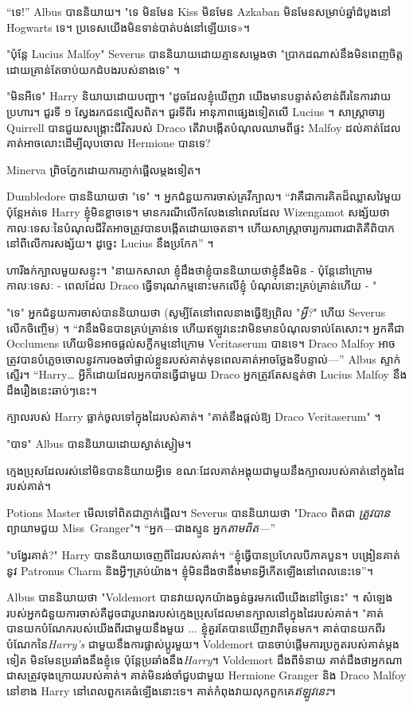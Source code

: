 {{{“ទេ!” Albus បាននិយាយ។ "ទេ មិនមែន Kiss មិនមែន Azkaban មិនមែនសម្រាប់ឆ្នាំដំបូងនៅ Hogwarts ទេ។ ប្រទេស​យើង​មិន​ទាន់​បាត់បង់​នៅឡើយ​ទេ​»​។

"ប៉ុន្តែ Lucius Malfoy" Severus បាននិយាយដោយគ្មានសម្លេងថា "ប្រាកដណាស់នឹងមិនពេញចិត្តដោយគ្រាន់តែចាប់យកដំបងរបស់នាងទេ" ។

"មិនអីទេ" Harry និយាយដោយបញ្ជា។ "ដូចដែលខ្ញុំឃើញវា យើងមានបន្ទាត់សំខាន់ពីរនៃការវាយប្រហារ។ ជួរទី ១ ស្វែងរកជនល្មើសពិត។ ជួរទីពីរ អានុភាពផ្សេងទៀតលើ Lucius ។ សាស្រ្តាចារ្យ Quirrell បានជួយសង្គ្រោះជីវិតរបស់ Draco តើវាបង្កើតបំណុលឈាមពីផ្ទះ Malfoy ដល់គាត់ដែលគាត់អាចលោះដើម្បីលុបចោល Hermione បានទេ?

Minerva ព្រិចភ្នែកដោយការភ្ញាក់ផ្អើលម្តងទៀត។

Dumbledore បាននិយាយថា "ទេ" ។ អ្នកជំនួយការចាស់គ្រវីក្បាល។ “វាគឺជាការគិតដ៏ឈ្លាសវៃមួយ ប៉ុន្តែអត់ទេ Harry ខ្ញុំមិនខ្លាចទេ។ មានករណីលើកលែងនៅពេលដែល Wizengamot សង្ស័យថាកាលៈទេសៈនៃបំណុលជីវិតអាចត្រូវបានបង្កើតដោយចេតនា។ ហើយ​សាស្ត្រាចារ្យ​ការពារ​ជាតិ​គឺ​ពិបាក​នៅ​ពី​លើ​ការ​សង្ស័យ។ ដូច្នេះ Lucius នឹងប្រកែក” ។

ហារីងក់ក្បាលមួយសន្ទុះ។ "នាយកសាលា ខ្ញុំដឹងថាខ្ញុំបាននិយាយថាខ្ញុំនឹងមិន - ប៉ុន្តែនៅក្រោមកាលៈទេសៈ - ពេលដែល Draco ធ្វើទារុណកម្មនោះមកលើខ្ញុំ បំណុលនោះគ្រប់គ្រាន់ហើយ - "

"ទេ" អ្នកជំនួយការចាស់បាននិយាយថា (សូម្បីតែនៅពេលនាងធ្វើឱ្យព្រិល "\emph{អ្វី?}" ហើយ Severus លើកចិញ្ចើម) ។ “វា​នឹង​មិន​បាន​គ្រប់​គ្រាន់​ទេ ហើយ​ឥឡូវ​នេះ​វា​មិន​មាន​បំណុល​ទាល់​តែ​សោះ។ អ្នកគឺជា Occlumens ហើយមិនអាចផ្តល់សក្ខីកម្មនៅក្រោម Veritaserum បានទេ។ Draco Malfoy អាច​ត្រូវ​បាន​បំភ្លេច​ចោល​នូវ​ការ​ចងចាំ​ផ្ទាល់​ខ្លួន​របស់​គាត់​មុន​ពេល​គាត់​អាច​ថ្លែង​ទីបន្ទាល់—” Albus ស្ទាក់​ស្ទើរ។ “Harry… អ្វីក៏ដោយដែលអ្នកបានធ្វើជាមួយ Draco អ្នកត្រូវតែសន្មត់ថា Lucius Malfoy នឹងដឹងរឿងនេះឆាប់ៗនេះ។

ក្បាលរបស់ Harry ធ្លាក់ចូលទៅក្នុងដៃរបស់គាត់។ "គាត់នឹងផ្តល់ឱ្យ Draco Veritaserum" ។

"បាទ" Albus បាននិយាយដោយស្ងាត់ស្ងៀម។

ក្មេងប្រុសដែលរស់នៅមិនបាននិយាយអ្វីទេ ខណៈដែលគាត់អង្គុយជាមួយនឹងក្បាលរបស់គាត់នៅក្នុងដៃរបស់គាត់។

Potions Master មើលទៅពិតជាភ្ញាក់ផ្អើល។ Severus បាននិយាយថា "Draco ពិតជា \emph{ត្រូវបាន} ព្យាយាមជួយ Miss~Granger"។ “អ្នក—ជាងស្មូន អ្នក\emph{តាមពិត—}”

"បង្វែរគាត់?" Harry បាននិយាយចេញពីដៃរបស់គាត់។ “ខ្ញុំធ្វើបានប្រហែលបីភាគបួន។ បង្រៀនគាត់នូវ Patronus Charm និងអ្វីៗគ្រប់យ៉ាង។ ខ្ញុំមិនដឹងថានឹងមានអ្វីកើតឡើងនៅពេលនេះទេ”។

Albus បាននិយាយថា "Voldemort បានវាយលុកយ៉ាងធ្ងន់ធ្ងរមកលើយើងនៅថ្ងៃនេះ" ។ សំឡេង​របស់​អ្នក​ជំនួយការ​ចាស់​គឺ​ដូច​ជា​រូបរាង​របស់​ក្មេង​ប្រុស​ដែល​មាន​ក្បាល​នៅ​ក្នុង​ដៃ​របស់​គាត់។ "គាត់បានយកបំណែករបស់យើងពីរជាមួយនឹងមួយ ... ខ្ញុំគួរតែបានឃើញវាពីមុនមក។ គាត់បានយកពីរបំណែកនៃ\emph{Harry's} ជាមួយនឹងការផ្លាស់ប្តូរមួយ។ Voldemort បានចាប់ផ្តើមការប្រកួតរបស់គាត់ម្តងទៀត មិនមែនប្រឆាំងនឹងខ្ញុំទេ ប៉ុន្តែប្រឆាំងនឹង\emph{Harry}។ Voldemort ដឹងពីទំនាយ គាត់ដឹងថាអ្នកណាជាសត្រូវចុងក្រោយរបស់គាត់។ គាត់មិនរង់ចាំជួបជាមួយ Hermione Granger និង Draco Malfoy នៅខាង Harry នៅពេលពួកគេធំឡើងនោះទេ។ គាត់កំពុងវាយលុកពួកគេ\emph{ឥឡូវនេះ}។

}}}

